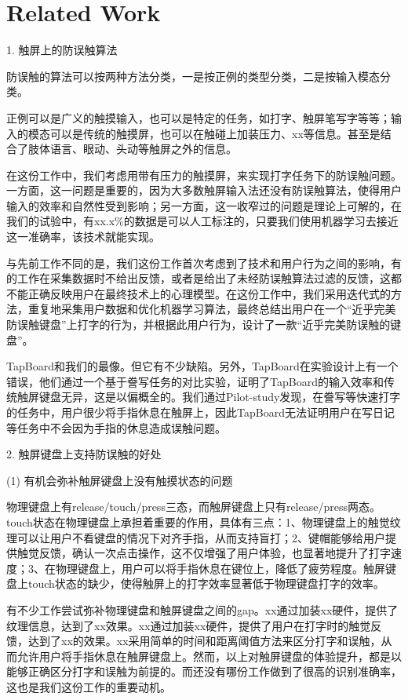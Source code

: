 \section{Related Work}

1. 触屏上的防误触算法

防误触的算法可以按两种方法分类，一是按正例的类型分类，二是按输入模态分类。

正例可以是广义的触摸输入，也可以是特定的任务，如打字、触屏笔写字等等；输入的模态可以是传统的触摸屏，也可以在触碰上加装压力、xx等信息。甚至是结合了肢体语言、眼动、头动等触屏之外的信息。

在这份工作中，我们考虑用带有压力的触摸屏，来实现打字任务下的防误触问题。一方面，这一问题是重要的，因为大多数触屏输入法还没有防误触算法，使得用户输入的效率和自然性受到影响；另一方面，这一收窄过的问题是理论上可解的，在我们的试验中，有xx.x\%的数据是可以人工标注的，只要我们使用机器学习去接近这一准确率，该技术就能实现。

与先前工作不同的是，我们这份工作首次考虑到了技术和用户行为之间的影响，有的工作在采集数据时不给出反馈，或者是给出了未经防误触算法过滤的反馈，这都不能正确反映用户在最终技术上的心理模型。在这份工作中，我们采用迭代式的方法，重复地采集用户数据和优化机器学习算法，最终总结出用户在一个“近乎完美防误触键盘”上打字的行为，并根据此用户行为，设计了一款“近乎完美防误触的键盘”。

TapBoard和我们的最像。但它有不少缺陷。另外，TapBoard在实验设计上有一个错误，他们通过一个基于誊写任务的对比实验，证明了TapBoard的输入效率和传统触屏键盘无异，这是以偏概全的。我们通过Pilot-study发现，在誊写等快速打字的任务中，用户很少将手指休息在触屏上，因此TapBoard无法证明用户在写日记等任务中不会因为手指的休息造成误触问题。

2. 触屏键盘上支持防误触的好处

(1) 有机会弥补触屏键盘上没有触摸状态的问题

物理键盘上有release/touch/press三态，而触屏键盘上只有release/press两态。touch状态在物理键盘上承担着重要的作用，具体有三点：1、物理键盘上的触觉纹理可以让用户不看键盘的情况下对齐手指，从而支持盲打；2、键帽能够给用户提供触觉反馈，确认一次点击操作，这不仅增强了用户体验，也显著地提升了打字速度；3、在物理键盘上，用户可以将手指休息在键位上，降低了疲劳程度。触屏键盘上touch状态的缺少，使得触屏上的打字效率显著低于物理键盘打字的效率。

有不少工作尝试弥补物理键盘和触屏键盘之间的gap。xx通过加装xx硬件，提供了纹理信息，达到了xx效果。xx通过加装xx硬件，提供了用户在打字时的触觉反馈，达到了xx的效果。xx采用简单的时间和距离阈值方法来区分打字和误触，从而允许用户将手指休息在触屏键盘上。然而，以上对触屏键盘的体验提升，都是以能够正确区分打字和误触为前提的。而还没有哪份工作做到了很高的识别准确率，这也是我们这份工作的重要动机。

